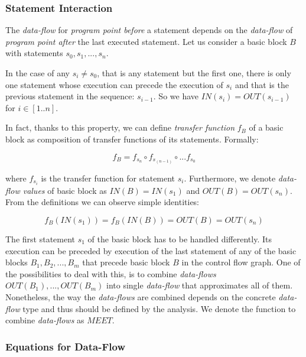         \subsubsection*{Statement Interaction}
        
        The \emph{data-flow} for \emph{program point before} a statement 
        depends on the \emph{data-flow} of \emph{program point after} the 
        last executed statement. Let us consider a basic block $B$ with 
        statements $s_0, s_1, ..., s_n$.
        
        In the case of any $s_i \neq s_0$, that is any statement but 
        the first one, there is only one statement whose execution 
        can precede the execution of $s_i$ and that is the previous statement 
        in the sequence: $s_{i-1}$. So we have $IN(s_i) = OUT(s_{i-1})$ 
        for $i\in{[1..n]}$. 
        
        In fact, thanks to this property, we can define \emph{transfer function} 
        $f_B$ of a basic block as composition of transfer functions of 
        its statements. Formally: 
        
        \[ f_B = f_{s_n} \circ f_{s_{(n-1)}} \circ ... f_{s_0} \]
        
        where $f_{s_i}$ is the transfer function for statement $s_i$.            
        Furthermore, we denote \emph{data-flow values} of basic block as 
        $IN(B)=IN(s_1)$ and $OUT(B)=OUT(s_n)$. From the definitions we can 
        observe simple identities: 
        
        \[ f_B(IN(s_1))=f_B(IN(B))=OUT(B)=OUT(s_n) \]
        
        The first statement $s_1$ of the basic block has to be 
        handled differently. Its execution can be preceded by 
        execution of the last statement of any of 
        the basic blocks $B_1, B_2, ..., B_m$ that precede basic block 
        $B$ in the control flow graph. One of the possibilities to deal with 
        this, is to combine \emph{data-flows} $OUT(B_1), ..., OUT(B_m)$ into 
        single \emph{data-flow} that approximates all of them. 
        Nonetheless, the way the \emph{data-flows} are combined depends 
        on the concrete \emph{data-flow} type and thus 
        should be defined by the analysis. We denote the function to 
        combine \emph{data-flows} as $\mathit{MEET}$. 
        
        \subsubsection*{Equations for Data-Flow}
        
